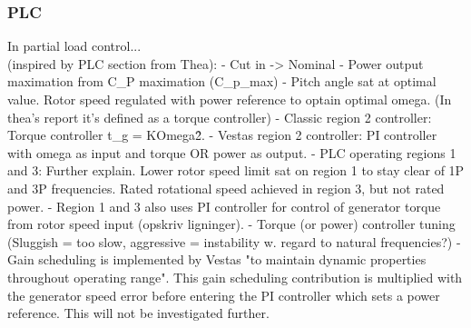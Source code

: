 \subsubsection{PLC}
In partial load control...\\

(inspired by PLC section from Thea):
- Cut in -> Nominal
- Power output maximation from C\_P maximation (C\_p\_max)
- Pitch angle sat at optimal value. Rotor speed regulated with power reference to optain optimal omega. (In thea's report it's defined as a torque controller)
- Classic region 2 controller: Torque controller t\_g = KOmega\^2.
- Vestas region 2 controller: PI controller with omega as input and torque OR power as output.
- PLC operating regions 1 and 3: Further explain. Lower rotor speed limit sat on region 1 to stay clear of 1P and 3P frequencies. Rated rotational speed achieved in region 3, but not rated power.
- Region 1 and 3 also uses PI controller for control of generator torque from rotor speed input (opskriv ligninger).
- Torque (or power) controller tuning (Sluggish = too slow, aggressive = instability w. regard to natural frequencies?)
- Gain scheduling is implemented by Vestas "to maintain dynamic properties throughout operating range". This gain scheduling contribution is multiplied with the generator speed error before entering the PI controller which sets a power reference. This will not be investigated further. \\

